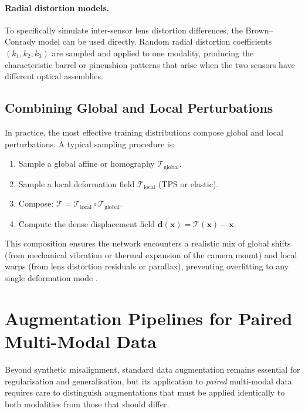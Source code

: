 \paragraph{Radial distortion models.}
To specifically simulate inter-sensor lens distortion differences, the
Brown--Conrady model \cite{brown1966decentering} can be used directly.  Random
radial distortion coefficients $(k_1, k_2, k_3)$ are sampled and applied to
one modality, producing the characteristic barrel or pincushion patterns that
arise when the two sensors have different optical assemblies.

\subsection{Combining Global and Local Perturbations}
\label{subsec:combined_perturbations}

In practice, the most effective training distributions compose global and
local perturbations.  A typical sampling procedure is:
\begin{enumerate}
    \item Sample a global affine or homography $\mathcal{T}_{\mathrm{global}}$.
    \item Sample a local deformation field $\mathcal{T}_{\mathrm{local}}$
          (TPS or elastic).
    \item Compose: $\mathcal{T} = \mathcal{T}_{\mathrm{local}} \circ
          \mathcal{T}_{\mathrm{global}}$.
    \item Compute the dense displacement field
          $\mathbf{d}(\mathbf{x}) = \mathcal{T}(\mathbf{x}) - \mathbf{x}$.
\end{enumerate}
This composition ensures the network encounters a realistic mix of global
shifts (from mechanical vibration or thermal expansion of the camera mount)
and local warps (from lens distortion residuals or parallax), preventing
overfitting to any single deformation mode
\cite{detone2016deep, rocco2017convolutional}.


\section{Augmentation Pipelines for Paired Multi-Modal Data}
\label{sec:augmentation_pipelines}

Beyond synthetic misalignment, standard data augmentation remains essential for
regularisation and generalisation, but its application to \emph{paired}
multi-modal data requires care to distinguish augmentations that must be
applied identically to both modalities from those that should differ.

